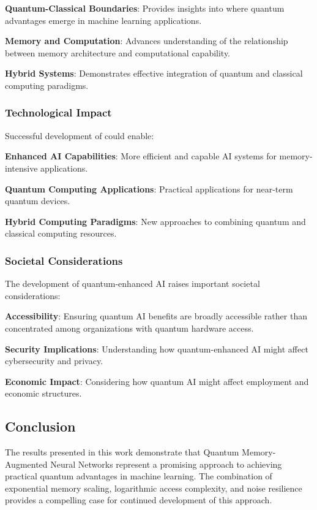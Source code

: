 \textbf{Quantum-Classical Boundaries}: Provides insights into where quantum advantages emerge in machine learning applications.

\textbf{Memory and Computation}: Advances understanding of the relationship between memory architecture and computational capability.

\textbf{Hybrid Systems}: Demonstrates effective integration of quantum and classical computing paradigms.

\subsubsection{Technological Impact}

Successful development of \qmnn could enable:

\textbf{Enhanced AI Capabilities}: More efficient and capable AI systems for memory-intensive applications.

\textbf{Quantum Computing Applications}: Practical applications for near-term quantum devices.

\textbf{Hybrid Computing Paradigms}: New approaches to combining quantum and classical computing resources.

\subsubsection{Societal Considerations}

The development of quantum-enhanced AI raises important societal considerations:

\textbf{Accessibility}: Ensuring quantum AI benefits are broadly accessible rather than concentrated among organizations with quantum hardware access.

\textbf{Security Implications}: Understanding how quantum-enhanced AI might affect cybersecurity and privacy.

\textbf{Economic Impact}: Considering how quantum AI might affect employment and economic structures.

\subsection{Conclusion}

The results presented in this work demonstrate that Quantum Memory-Augmented Neural Networks represent a promising approach to achieving practical quantum advantages in machine learning. The combination of exponential memory scaling, logarithmic access complexity, and noise resilience provides a compelling case for continued development of this approach.

